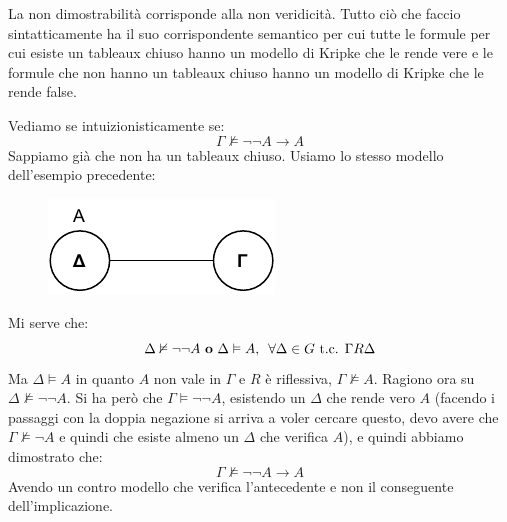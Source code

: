 \documentclass[a4paper,12pt, oneside]{book}
\begin{document}
\begin{teorema}
  La non dimostrabilità corrisponde alla non veridicità. Tutto ciò che faccio
  sintatticamente ha il suo corrispondente semantico per cui tutte le formule
  per cui esiste un tableaux chiuso hanno un modello di Kripke che le rende vere
  e le formule che non hanno un tableaux chiuso hanno un modello di Kripke che
  le rende false.
\end{teorema}
\begin{esempio}
  Vediamo se intuizionisticamente se:
  \[\Gamma\nvDash\neg\neg A\to A\]
  Sappiamo già che non ha un tableaux chiuso. Usiamo lo stesso modello
  dell'esempio precedente:
  \begin{figure}[H]
    \centering
    \includegraphics[scale = 0.9]{img/k1.pdf}
  \end{figure}
  Mi serve che:
  \[\Delta\nvDash \neg\neg A\mbox{ \textbf{o} }\Delta\vDash A,\,\,\,\forall
    \Delta\in G \mbox{ t.c. } \Gamma R\Delta\]
  Ma $\Delta\vDash A$ in quanto $A$ non vale in $\Gamma$ e $R$ è
  riflessiva, $\Gamma\nvDash A$. Ragiono ora su $\Delta\nvDash \neg\neg A$. Si
  ha però che $\Gamma\vDash \neg\neg A$, esistendo un $\Delta$ che rende vero
  $A$ (facendo i passaggi con la doppia negazione si arriva a voler cercare
  questo, devo avere che $\Gamma\nvDash\neg A$ e quindi che esiste almeno un
  $\Delta$ che verifica $A$), e quindi abbiamo dimostrato che: 
  \[\Gamma\nvDash\neg\neg A\to A\]
  Avendo un contro modello che verifica l'antecedente e non il conseguente
  dell'implicazione. 
\end{esempio}
\end{document}

